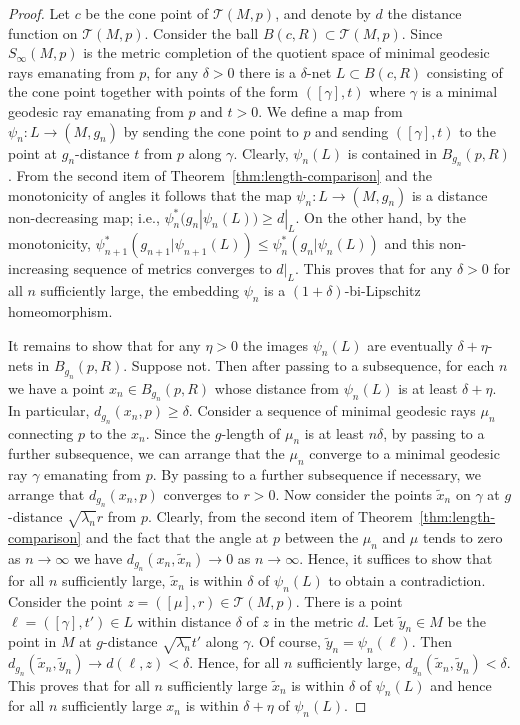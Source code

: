 \begin{proof}
\sketch
{}
Let $c$ be the cone point of ${\mathcal T}(M,p)$, and denote by $d$ the
distance function on ${\mathcal T}(M,p)$. Consider the ball $B(c,R)\subset
{\mathcal T}(M,p)$. Since $S_\infty(M,p)$ is the metric completion of the
quotient space of minimal geodesic rays emanating from $p$, for any $\delta>0$
there is a $\delta$-net $L\subset B(c,R)$ consisting of the cone point together
with points of the form $([\gamma],t)$ where $\gamma$ is a minimal geodesic ray
emanating from $p$ and $t>0$. We define a map from $\psi_n\colon L \to (M,g_n)$
by sending the cone point to $p$ and sending $([\gamma],t)$ to the point at
$g_n$-distance $t$ from $p$ along $\gamma$. Clearly, $\psi_n(L)$ is contained
in $B_{g_n}(p,R)$. From the second item of Theorem~\ref{thm:length-comparison} and the
monotonicity of angles it follows that the map $\psi_n\colon L\to (M,g_n)$ is a
distance non-decreasing map; i.e., $\psi_n^*(g_n|\psi_n(L))\ge d|_L$. On the
other hand, by the monotonicity, $\psi_{n+1}^*(g_{n+1}|\psi_{n+1}(L))\le
\psi_n^*(g_n|\psi_n(L))$ and this non-increasing sequence of metrics converges
to $d|_L$. This proves that for any $\delta>0$ for all $n$ sufficiently large,
the embedding $\psi_n$ is a $(1+\delta)$-bi-Lipschitz homeomorphism.

 It remains to show that for any $\eta>0$ the images $\psi_n(L)$ are eventually
$\delta+\eta$-nets in $B_{g_n}(p,R)$. Suppose not. Then after
passing to a subsequence, for each $n$ we have a point $x_n\in
B_{g_n}(p,R)$ whose distance from $\psi_n(L)$ is at least
$\delta+\eta$. In particular, $d_{g_n}(x_n,p)\ge \delta$. Consider a
sequence of minimal geodesic rays $\mu_n$ connecting $p$ to the
$x_n$. Since the $g$-length of $\mu_n$ is at least $n\delta$,  by
passing to a further subsequence, we can arrange that the $\mu_n$
converge to a minimal geodesic ray $\gamma$ emanating from $p$. By
passing to a further subsequence if necessary, we arrange that
$d_{g_n}(x_n,p)$ converges to $r>0$. Now consider the points $\tilde
x_n$ on $\gamma$ at $g$-distance $\sqrt{\lambda_n}r$ from $p$.
Clearly, from the second item of Theorem~\ref{thm:length-comparison} and the
fact that the angle at $p$ between the $\mu_n$ and $\mu$ tends to
zero as $n\rightarrow\infty$ we have $d_{g_n}(x_n,\tilde
x_n)\rightarrow 0$ as $n\rightarrow\infty$. Hence, it suffices to
show that for all $n$ sufficiently large, $\tilde x_n$ is within
$\delta$ of $\psi_n(L)$ to obtain a contradiction. Consider the
point $z=([\mu],r)\in {\mathcal T}(M,p)$. There is a point
$\ell=([\gamma],t')\in L$ within distance $\delta$ of $z$ in the
metric $d$. Let $\tilde y_n\in M$ be the point in $M$ at
$g$-distance $\sqrt{\lambda_n}t'$ along $\gamma$. Of course, $\tilde
y_n=\psi_n(\ell)$. Then $d_{g_n}(\tilde x_n,\tilde y_n)\rightarrow
d(\ell,z)<\delta$. Hence, for all $n$ sufficiently large,
$d_{g_n}(\tilde x_n,\tilde y_n)<\delta$. This proves that for all
$n$ sufficiently large $\tilde x_n$ is within $\delta$ of
$\psi_n(L)$ and hence for all $n$ sufficiently large $x_n$ is within
$\delta+\eta$ of $\psi_n(L)$.


\end{proof}
